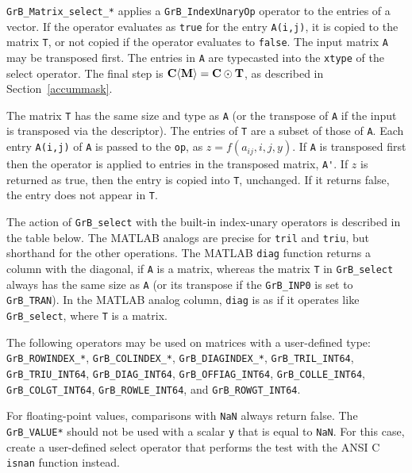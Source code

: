 \documentclass[12pt]{article}
\begin{document}
\verb'GrB_Matrix_select_*' applies a \verb'GrB_IndexUnaryOp' operator to the
entries of a vector.  If the operator evaluates as \verb'true' for the entry
\verb'A(i,j)', it is copied to the matrix \verb'T', or not copied if the
operator evaluates to \verb'false'.  The input matrix \verb'A' may be
transposed first.  The entries in \verb'A' are typecasted into the \verb'xtype'
of the select operator.  The final step is ${\bf C \langle M \rangle  = C \odot
T}$, as described in Section~\ref{accummask}.

The matrix \verb'T' has the same size and type as \verb'A' (or the transpose of
\verb'A' if the input is transposed via the descriptor).  The entries of
\verb'T' are a subset of those of \verb'A'.  Each entry \verb'A(i,j)' of
\verb'A' is passed to the \verb'op', as $z=f(a_{ij},i,j,y)$.  If
\verb'A' is transposed first then the operator is applied to entries in the
transposed matrix, \verb"A'".  If $z$ is returned as true, then the entry is
copied into \verb'T', unchanged.  If it returns false, the entry does not
appear in \verb'T'.

The action of \verb'GrB_select' with the built-in index-unary operators is
described in the table below.  The MATLAB analogs are precise for \verb'tril'
and \verb'triu', but shorthand for the other operations.  The MATLAB
\verb'diag' function returns a column with the diagonal, if \verb'A' is a
matrix, whereas the matrix \verb'T' in \verb'GrB_select' always has the same
size as \verb'A' (or its transpose if the \verb'GrB_INP0' is set to
\verb'GrB_TRAN').  In the MATLAB analog column, \verb'diag' is as if it
operates like \verb'GrB_select', where \verb'T' is a matrix.

The following operators may be used on matrices with a user-defined type:
\verb'GrB_ROWINDEX_*',
\verb'GrB_COLINDEX_*',
\verb'GrB_DIAGINDEX_*',
\verb'GrB_TRIL_INT64', \newline
\verb'GrB_TRIU_INT64',
\verb'GrB_DIAG_INT64',
\verb'GrB_OFFIAG_INT64',
\verb'GrB_COLLE_INT64',
\verb'GrB_COLGT_INT64',
\verb'GrB_ROWLE_INT64',
and
\verb'GrB_ROWGT_INT64'.

For floating-point values, comparisons with \verb'NaN' always return false.
The \verb'GrB_VALUE*' should not be used with a scalar \verb'y' that is
equal to \verb'NaN'.  For this case, create a user-defined select operator that
performs the test with the ANSI C \verb'isnan' function instead.
\end{document}
